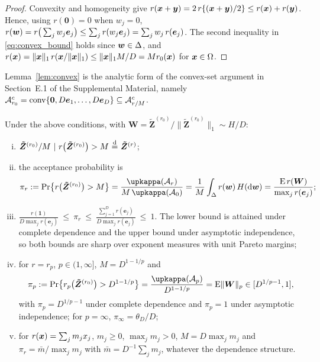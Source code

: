 \documentclass[12pt]{article}
\let\amsfrac\frac
\let\frac\amsfrac
\newcommand{\Zr}[1]{\bm{\tilde Z}^{(#1)}}
\newcommand{\bW}{\bm W}
\newcommand{\one}{\bm 1}
\begin{document}
\begin{proof}
Convexity and homogeneity give $r({\boldsymbol{x}}+\bm y)=2\,r\{({\boldsymbol{x}}+\bm y)/2\}\leq r({\boldsymbol{x}})+r(\bm y)$. Hence, using $r(\bm 0)=0$ when $w_j=0$, $r({\boldsymbol{w}})=r\big(\sum_jw_j\bm e_j\big)\leq\sum_jr(w_j\bm e_j)=\sum_jw_j\,r(\bm e_j)$. The second inequality in \eqref{eq:convex_bound} holds since ${\boldsymbol{w}}\in\Delta$, and $r({\boldsymbol{x}})=\|{\boldsymbol{x}}\|_1\,r({\boldsymbol{x}}/\|{\boldsymbol{x}}\|_1)\leq\|{\boldsymbol{x}}\|_1M/D=Mr_0({\boldsymbol{x}})$ for ${\boldsymbol{x}}\in\Omega$.
\end{proof}

Lemma~\ref{lem:convex} is the analytic form of the convex-set argument in Section~E.1 of the Supplemental Material, namely ${\mathcal A}_{r_0}^c=\mathrm{conv}\{\bm 0,D\bm e_1,\dots,D\bm e_D\}\subseteq{\mathcal A}_{r/M}^c$.

\begin{proposition}\label{prop:r0_to_r}
Under the above conditions, with $\bW=\Zr{r_0}/\|\Zr{r_0}\|_1\sim H/D$:
\begin{enumerate}[(i)]
\item $\Zr{r_0}/M\ |\ r\big(\Zr{r_0}\big)>M\ \eqd\ \Zr{r}$;
\item the acceptance probability is
$$
\pi_r:=\Pr\big\{r\big(\Zr{r_0}\big)>M\big\}=\frac{\upkappa(\calA_r)}{M\,\upkappa(\calA_0)}=\frac1M\int_\Delta r(\bw)\,H(\text d\bw)=\frac{\E\,r(\bW)}{\max_jr(\bm e_j)};
$$
\item $\displaystyle \frac{r(\one)}{D\max_jr(\bm e_j)}\ \leq\ \pi_r\ \leq\ \frac{\sum_{j=1}^Dr(\bm e_j)}{D\max_jr(\bm e_j)}\ \leq\ 1$. The lower bound is attained under complete dependence and the upper bound under asymptotic independence, so both bounds are sharp over exponent measures with unit Pareto margins;
\item for $r=r_p$, $p\in(1,\infty]$, $M=D^{1-1/p}$ and
$$
\pi_p:=\Pr\big\{r_p\big(\Zr{r_0}\big)>D^{1-1/p}\big\}=\frac{\upkappa(\calA_p)}{D^{1-1/p}}=\E\|\bW\|_p\in[D^{1/p-1},1],
$$
with $\pi_p=D^{1/p-1}$ under complete dependence and $\pi_p=1$ under asymptotic independence; for $p=\infty$, $\pi_\infty=\theta_D/D$;
\item for $r({\boldsymbol{x}})=\sum_jm_jx_j$, $m_j\geq0$, $\max_jm_j>0$, $M=D\max_jm_j$ and $\pi_r=\bar m/\max_jm_j$ with $\bar m=D^{-1}\sum_jm_j$, whatever the dependence structure.
\end{enumerate}
\end{proposition}
\end{document}

